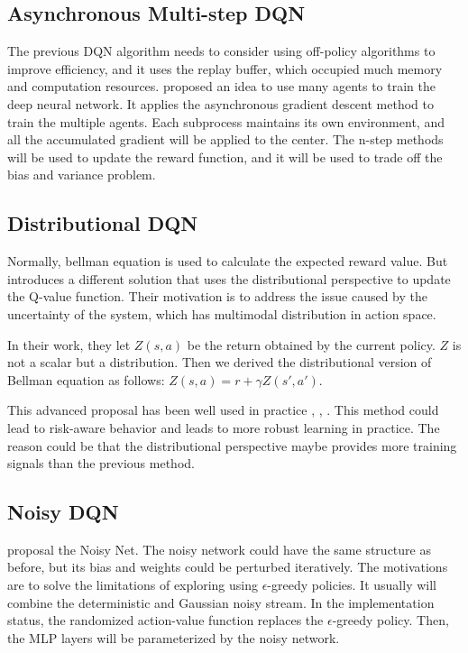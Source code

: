 \documentclass{article}
\begin{document}
\subsection{Asynchronous Multi-step DQN}
The previous DQN algorithm needs to consider using off-policy algorithms to improve efficiency, and it uses the replay buffer, which occupied much memory and computation resources. \citep{mnih2016asynchronous} proposed an idea to use many agents to train the deep neural network. It applies the asynchronous gradient descent method to train the multiple agents. Each subprocess maintains its own environment, and all the accumulated gradient will be applied to the center.
The n-step methods \citep{sutton2018reinforcement} will be used to update the reward function, and it will be used to trade off the bias and variance problem.

\subsection{Distributional  DQN}
Normally, bellman equation is used to calculate the expected reward value. But \citep{bellemare2017distributional} introduces a different solution that uses the distributional perspective to update the Q-value function. Their motivation is to address the issue caused by the uncertainty of the system, which has multimodal distribution in action space.

In their work, they let  ${Z}(s,a)$ be the return obtained by the current policy. ${Z}$ is not a scalar but a distribution. Then we derived the distributional version of Bellman equation as follows: ${Z}(s,a) = r + \gamma {Z}(s',a')$. 

This advanced proposal has been well used in practice \citep{bellemare2017distributional}, \citep{dabney2018distributional},  \citep{rowland2018analysis}. This method could lead to risk-aware behavior \citep{morimura2010nonparametric} and leads to more robust learning in practice. The reason could be that the distributional perspective maybe provides more training signals than the previous method.

\subsection{Noisy DQN}
\citep{fortunato2017noisy} proposal the Noisy Net. The noisy network could have the same structure as before, but its bias and weights could be perturbed iteratively. The motivations are to solve the limitations of exploring using $\epsilon$-greedy policies. It usually will combine the deterministic and Gaussian noisy stream.
In the implementation status, the randomized action-value function replaces the $\epsilon$-greedy policy. Then, the MLP layers will be parameterized by the noisy network. 
\end{document}
